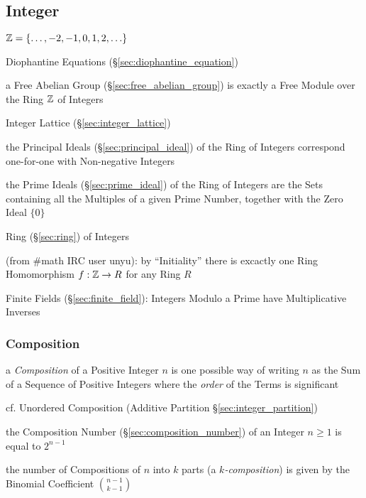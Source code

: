 \subsection{Integer}\label{sec:integer}

$\mathbb{Z} = \{ \ldots, -2, -1, 0, 1, 2, \ldots \}$

\fist Diophantine Equations (\S\ref{sec:diophantine_equation})

\fist a Free Abelian Group (\S\ref{sec:free_abelian_group}) is exactly a Free
Module over the Ring $\mathbb{Z}$ of Integers

\fist Integer Lattice (\S\ref{sec:integer_lattice})

the Principal Ideals (\S\ref{sec:principal_ideal}) of the Ring of Integers
correspond one-for-one with Non-negative Integers

the Prime Ideals (\S\ref{sec:prime_ideal}) of the Ring of Integers are the Sets
containing all the Multiples of a given Prime Number, together with the Zero
Ideal $\{0\}$

Ring (\S\ref{sec:ring}) of Integers

(from \#math IRC user unyu): by ``Initiality'' there is excactly one Ring
Homomorphism $f : \mathbb{Z} \rightarrow R$ for any Ring $R$

Finite Fields (\S\ref{sec:finite_field}): Integers Modulo a Prime have
Multiplicative Inverses



\subsubsection{Composition}\label{sec:composition}

a \emph{Composition} of a Positive Integer $n$ is one possible way of writing
$n$ as the Sum of a Sequence of Positive Integers where the \emph{order} of the
Terms is significant

cf. Unordered Composition (Additive Partition \S\ref{sec:integer_partition})

the Composition Number (\S\ref{sec:composition_number}) of an Integer $n \geq 1$
is equal to $2^{n-1}$

the number of Compositions of $n$ into $k$ parts (a \emph{$k$-composition}) is
given by the Binomial Coefficient $\binom{n-1}{k-1}$




